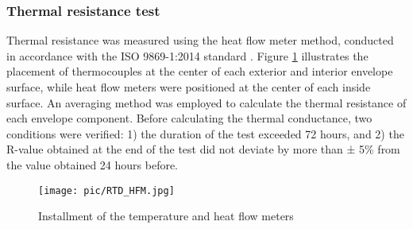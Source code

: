 \documentclass[3p,times,12pt]{elsarticle}
\begin{document}
\begin{sloppypar}
\begin{table}[H]
\centering
\scriptsize
\caption{Technical specifications and accuracy}
\label{tab:sensors}
\end{table}

\subsubsection{Thermal resistance test}
\label{S:2.2.1}
Thermal resistance was measured using the heat flow meter method, conducted in accordance with the ISO 9869-1:2014 standard \cite{iso20149869}. Figure \ref{fig:RTD_HFM} illustrates the placement of thermocouples at the center of each exterior and interior envelope surface, while heat flow meters were positioned at the center of each inside surface. An averaging method was employed to calculate the thermal resistance of each envelope component. Before calculating the thermal conductance, two conditions were verified: 1) the duration of the test exceeded 72 hours, and 2) the R-value obtained at the end of the test did not deviate by more than ± 5\% from the value obtained 24 hours before.

\begin{figure}[H]
\centering\texttt{[image: pic/RTD\_HFM.jpg]}
\caption{Installment of the temperature and heat flow meters}
\label{fig:RTD_HFM}
\end{figure}


\end{sloppypar}
\end{document}
